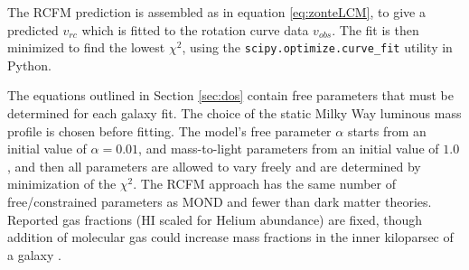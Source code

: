 \documentclass[reprint,%
 amsmath,amssymb,
 aps,
]{revtex4-1}
\begin{document}
 








The RCFM prediction is    assembled as in equation \ref{eq:zonteLCM}, to give a predicted $v_{rc}$ which is fitted to the rotation curve data $v_{obs}$. The fit is then minimized to find the  lowest   $\chi^2$,  using the {\tt scipy.optimize.curve\_fit} utility in Python.

The equations outlined in Section \ref{sec:dos} contain   free parameters that must be determined for each galaxy fit. The choice of the static Milky Way luminous mass profile is chosen before fitting. The     model's free parameter $\alpha$ starts from  an initial value of $\alpha = 0.01$, and  mass-to-light parameters from an initial value of $1.0$, and then all parameters are     allowed to vary freely and are determined by  minimization of the $\chi^2$. 
The RCFM approach  has  the same number of free/constrained parameters as MOND and fewer than dark matter theories.
 Reported gas fractions (HI scaled for Helium abundance) are fixed,  though addition of molecular gas could increase mass fractions in the inner kiloparsec of a galaxy   \cite{2004ApJ...609..652M}.  
\end{document}
